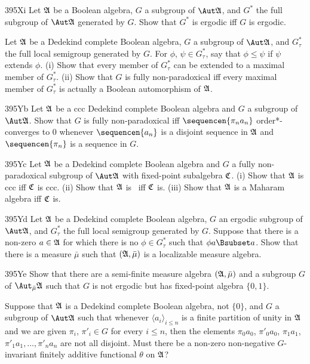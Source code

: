 {\spheader 395Xi Let $\frak A$ be a Boolean algebra, $G$ a subgroup of
$\Aut\frak A$, and $G^*$ the full subgroup of $\Aut\frak A$ generated by
$G$.   Show that $G^*$ is ergodic iff $G$ is ergodic.

Let $\frak A$ be a Dedekind complete Boolean algebra, $G$ a subgroup of
$\Aut\frak A$, and $G^*_{\tau}$ the full local semigroup generated by
$G$.   For $\phi$, $\psi\in G^*_{\tau}$, say that $\phi\le\psi$ if
$\psi$ extends $\phi$.   (i) Show that every member of $G^*_{\tau}$ can
be extended to a maximal member of $G^*_{\tau}$.   (ii) Show that $G$ is
fully non-paradoxical iff every maximal member of $G^*_{\tau}$ is
actually a Boolean automorphism of $\frak A$.

\spheader 395Yb Let $\frak A$ be a ccc Dedekind complete Boolean algebra
and $G$
a subgroup of $\Aut\frak A$.   Show that $G$ is fully non-paradoxical iff
$\sequencen{\pi_na_n}$ order*-converges to $0$ whenever $\sequencen{a_n}$
is a disjoint sequence in $\frak A$ and $\sequencen{\pi_n}$
is a sequence in $G$.

\spheader 395Yc Let $\frak A$ be a Dedekind complete Boolean algebra and
$G$ a fully non-paradoxical subgroup of $\Aut\frak A$ with fixed-point
subalgebra $\frak C$.   (i)
Show that $\frak A$ is ccc iff $\frak C$ is ccc.
(ii) Show that $\frak A$ is \wsid\ iff $\frak C$ is.
(iii) Show that $\frak A$ is a Maharam algebra iff $\frak C$ is.

\spheader 395Yd Let $\frak A$ be a Dedekind complete Boolean algebra,
$G$ an ergodic subgroup of $\Aut\frak A$, and $G^*_{\tau}$ the full local
semigroup generated by $G$.   Suppose that there is a non-zero
$a\in\frak A$ for which there is no $\phi\in G^*_{\tau}$ such that
$\phi a\Bsubset a$.   Show that there is a measure $\bar\mu$ such that
$(\frak A,\bar\mu)$ is a localizable measure algebra.   

\spheader 395Ye Show that there are a
semi-finite measure algebra $(\frak A,\bar\mu)$
and a subgroup $G$ of $\AmuA$ such that $G$ is not ergodic but
has fixed-point algebra $\{0,1\}$.
}%

 Suppose that $\frak A$ is a Dedekind complete
Boolean algebra, not $\{0\}$, and $G$ a subgroup of $\Aut\frak A$ such
that whenever $\langle a_i\rangle_{i\le n}$ is a finite partition of
unity in $\frak A$ and we are given $\pi_i$, $\pi'_i\in G$ for every
$i\le n$, then the elements $\pi_0a_0$, $\pi'_0a_0$, $\pi_1a_1$,
$\pi'_1a_1,\ldots,\pi'_na_n$ are not all disjoint.   Must there be a
non-zero non-negative $G$-invariant finitely additive functional
$\theta$ on $\frak A$?

